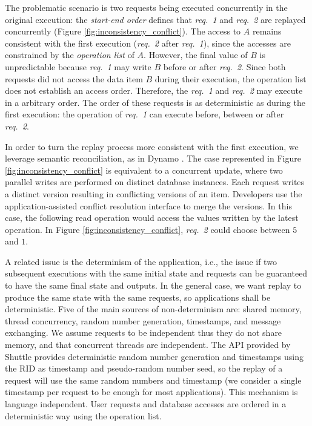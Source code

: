 The problematic scenario is two requests being executed concurrently in the original execution: the \emph{start-end order} defines that \emph{req.~1} and \emph{req.~2} are replayed concurrently (Figure \ref{fig:inconsistency_conflict}). The access to $A$ remains consistent with the first execution (\emph{req.~2} after \emph{req.~1}), since the accesses are constrained by the \emph{operation list} of $A$. However, the final value of $B$ is unpredictable because \emph{req.~1} may write $B$ before or after \emph{req.~2}. Since both requests did not access the data item $B$ during their execution, the operation list does not establish an access order. Therefore, the \emph{req.~1} and \emph{req.~2} may execute in a arbitrary order. The order of these requests is as deterministic as during the first execution: the operation of \emph{req.~1} can execute before, between or after \emph{req.~2}.

In order to turn the replay process more consistent with the first execution, we leverage semantic reconciliation, as in Dynamo \cite{Decandia2007}. The case represented in Figure \ref{fig:inconsistency_conflict} is equivalent to a concurrent update, where two parallel writes are performed on distinct database instances. Each request writes a distinct version resulting in conflicting versions of an item. Developers use the application-assisted conflict resolution interface to merge the versions. In this case, the following read operation would access the values written by the latest operation. In Figure \ref{fig:inconsistency_conflict}, \emph{req.~2} could choose between $5$ and $1$.

A related issue is the determinism of the application, i.e., the issue if two subsequent executions with the same initial state and requests can be guaranteed to have the same final state and outputs. In the general case, we want replay to produce the same state with the same requests, so applications shall be deterministic. 
Five of the main sources of non-determinism are: shared memory, thread concurrency, random number generation, timestamps, and message exchanging. We assume requests to be independent thus they do not share memory, and that concurrent threads are independent. The API provided by Shuttle provides deterministic random number generation and timestamps using the \ac{RID} as timestamp and pseudo-random number seed, so the replay of a request will use the same random numbers and timestamp (we consider a single timestamp per request to be enough for most applications). This mechanism is language independent. User requests and database accesses are ordered in a deterministic way using the operation list.


